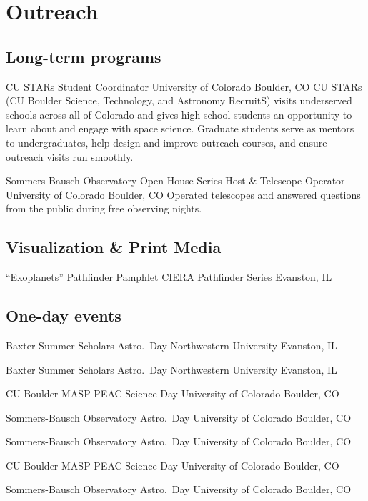 \section{Outreach}

\subsection{Long-term programs}

		{CU STARs}
		{Student Coordinator}
		{University of Colorado}
		{Boulder, CO}
		{
		CU STARs (CU Boulder Science, Technology, and Astronomy RecruitS) visits underserved schools across all of Colorado and gives high school students an opportunity to learn about and engage with space science.
		Graduate students serve as mentors to undergraduates, help design and improve outreach courses, and ensure outreach visits run smoothly.
    	}

    {Sommers-Bausch Observatory Open House Series}
    {Host \& Telescope Operator}
    {University of Colorado}    
	{Boulder, CO}
    {Operated telescopes and answered questions from the public during free observing nights.    }


\vspace{0.25cm}
\subsection{Visualization \& Print Media}
		{``Exoplanets'' Pathfinder Pamphlet}
		{}
		{CIERA Pathfinder Series}
		{Evanston, IL}
		{}

\vspace{0.25cm}
\subsection{One-day events}

		{Baxter Summer Scholars Astro.~Day}
		{}
		{Northwestern University}
		{Evanston, IL}
		{}



		{Baxter Summer Scholars Astro.~Day}
		{}
		{Northwestern University}
		{Evanston, IL}
		{}


		{CU Boulder MASP PEAC Science Day}
		{}
		{University of Colorado}
		{Boulder, CO}
		{}

\cventry{}
		{Sommers-Bausch Observatory Astro.~Day}
		{}
		{University of Colorado}
		{Boulder, CO}
		{}

		{Sommers-Bausch Observatory Astro.~Day}
		{}
		{University of Colorado}
		{Boulder, CO}
		{}

		{CU Boulder MASP PEAC Science Day}
		{}
		{University of Colorado}
		{Boulder, CO}
		{}

\cventry{}
		{Sommers-Bausch Observatory Astro.~Day}
		{}
		{University of Colorado}
		{Boulder, CO}
		{}



